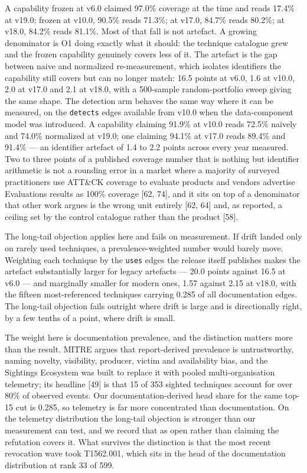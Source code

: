 \documentclass[11pt,a4paper]{article}
\begin{document}
A capability frozen at v6.0 claimed 97.0\% coverage at the time and reads 17.4\% at v19.0; frozen at v10.0, 90.5\% reads 71.3\%; at v17.0, 84.7\% reads 80.2\%; at v18.0, 84.2\% reads 81.1\%. Most of that fall is not artefact. A growing denominator is O1 doing exactly what it should: the technique catalogue grew and the frozen capability genuinely covers less of it. The artefact is the gap between naive and normalized re-measurement, which isolates identifiers the capability still covers but can no longer match: 16.5 points at v6.0, 1.6 at v10.0, 2.0 at v17.0 and 2.1 at v18.0, with a 500-sample random-portfolio sweep giving the same shape. The detection arm behaves the same way where it can be measured, on the \texttt{detects} edges available from v10.0 when the data-component model was introduced. A capability claiming 91.9\% at v10.0 reads 72.5\% naively and 74.0\% normalized at v19.0; one claiming 94.1\% at v17.0 reads 89.4\% and 91.4\% — an identifier artefact of 1.4 to 2.2 points across every year measured. Two to three points of a published coverage number that is nothing but identifier arithmetic is not a rounding error in a market where a majority of surveyed practitioners use ATT\&CK coverage to evaluate products and vendors advertise Evaluations results as 100\% coverage [62, 74], and it sits on top of a denominator that other work argues is the wrong unit entirely [62, 64] and, as reported, a ceiling set by the control catalogue rather than the product [58].

The long-tail objection applies here and fails on measurement. If drift landed only on rarely used techniques, a prevalence-weighted number would barely move. Weighting each technique by the \texttt{uses} edges the release itself publishes makes the artefact substantially larger for legacy artefacts — 20.0 points against 16.5 at v6.0 — and marginally smaller for modern ones, 1.57 against 2.15 at v18.0, with the fifteen most-referenced techniques carrying 0.285 of all documentation edges. The long-tail objection fails outright where drift is large and is directionally right, by a few tenths of a point, where drift is small.

The weight here is documentation prevalence, and the distinction matters more than the result. MITRE argues that report-derived prevalence is untrustworthy, naming novelty, visibility, producer, victim and availability bias, and the Sightings Ecosystem was built to replace it with pooled multi-organisation telemetry; its headline [49] is that 15 of 353 sighted techniques account for over 80\% of observed events. Our documentation-derived head share for the same top-15 cut is 0.285, so telemetry is far more concentrated than documentation. On the telemetry distribution the long-tail objection is stronger than our measurement can test, and we record that as open rather than claiming the refutation covers it. What survives the distinction is that the most recent revocation wave took T1562.001, which sits in the head of the documentation distribution at rank 33 of 599.
\end{document}
